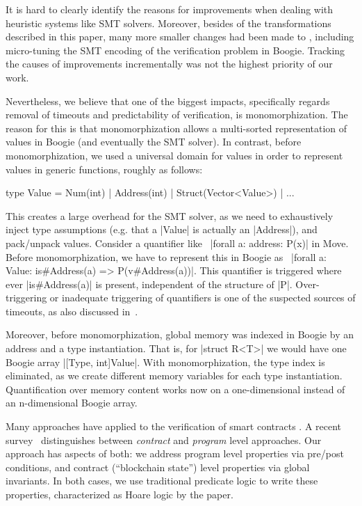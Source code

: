 
It is hard to clearly identify the reasons for improvements when dealing with
heuristic systems like SMT solvers. Moreover, besides of the transformations
described in this paper, many more smaller changes had been made to \MVP,
including micro-tuning the SMT encoding of the verification problem in
Boogie. Tracking the causes of improvements incrementally was not the highest
priority of our work.

Nevertheless, we believe that one of the biggest impacts, specifically regards
removal of timeouts and predictability of verification, is monomorphization. The
reason for this is that monomorphization allows a multi-sorted representation
of values in Boogie (and eventually the SMT solver). In contrast, before
monomorphization, we used a universal domain for values in order to represent
values in generic functions, roughly as follows:

\begin{Move}
  type Value = Num(int) | Address(int) | Struct(Vector<Value>) | ...
\end{Move}

\noindent This creates a large overhead for the SMT solver, as we need to
exhaustively inject type assumptions (e.g. that a |Value| is actually an
|Address|), and pack/unpack values. Consider a quantifier like~%
|forall a: address: P(x)| in Move. Before monomorphization, we have to represent
this in Boogie as~%
|forall a: Value: is#Address(a) => P(v#Address(a))|. This quantifier is
triggered where ever |is#Address(a)| is present, independent of the structure of
|P|. Over-triggering or inadequate triggering of quantifiers is one of the
suspected sources of timeouts, as also discussed in~\cite{BUTTERFLY}.

Moreover, before monomorphization, global memory was indexed in Boogie by an
address and a type instantiation. That is, for |struct R<T>| we would
have one Boogie array |[Type, int]Value|. With monomorphization, the type index
is eliminated, as we create different memory variables for each type
instantiation.  Quantification over memory content works now on a one-dimensional
instead of an n-dimensional Boogie array.


Many approaches have applied to the verification of smart contracts \cite{liu2019survey,miller2018smart,CONTRACT_VERIFICATION}.
A recent survey~\cite{CONTRACT_VERIFICATION} distinguishes between \emph{contract}
and \emph{program} level approaches. Our approach has aspects of both: we
address program level properties via pre/post conditions, and contract
(``blockchain state'') level properties via global invariants. In both cases, we
use traditional predicate logic to write these properties, characterized as
Hoare logic by the paper.

